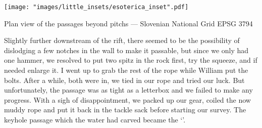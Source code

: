 \begin{marginsurvey}
\vspace{-130pt}
	\texttt{[image: "images/little\_insets/esoterica\_inset".pdf]}
	\caption[Esoterica]{Plan view of the passages beyond \protect{} pitchs --- Slovenian National Grid EPSG 3794}
\end{marginsurvey}

Slightly further downstream of the rift, there seemed to be the possibility of dislodging a few notches in the wall to make it passable, but since we only had one hammer, we resolved to put two spitz in the rock first, try the squeeze, and if needed enlarge it. I went up to grab the rest of the rope while William put the bolts. After a while, both were in, we tied in our rope and tried our luck. But unfortunately, the passage was as tight as a letterbox and we failed to make any progress. With a sigh of disappointment, we packed up our gear, coiled the now muddy rope and put it back in the tackle sack before starting our survey. The keyhole passage which the water had carved became the `'.


